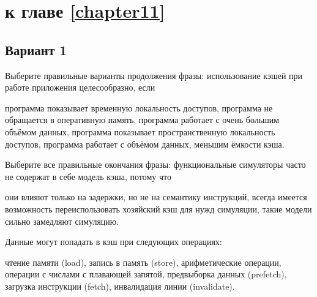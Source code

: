 \section{\Questions к главе \ref{chapter11}} %

\subsection*{Вариант 1}

\begin{questions}
\question[3] Выберите правильные варианты продолжения фразы: использование кэшей при работе приложения целесообразно, если
\begin{choices}
    \correctchoice    программа показывает временную локальность доступов,
    \choice программа не обращается в оперативную память,
    \choice программа работает с очень большим объёмом данных,
    \correctchoice программа показывает пространственную локальность доступов,
    \choice программа работает с объёмом данных, меньшим ёмкости кэша.
\end{choices}

\question[3] Выберите все правильные окончания фразы: функциональные симуляторы часто не содержат в себе модель кэша, потому что
\begin{choices}
	\correctchoice они влияют только на задержки, но не на семантику инструкций,
	\choice всегда имеется возможность переиспользовать хозяйский кэш для нужд симуляции,
	\correctchoice такие модели сильно замедляют симуляцию.
\end{choices}

\question[3] Данные могут попадать в кэш при следующих операциях:
\begin{choices}
	\correctchoice чтение памяти (load),
	\correctchoice запись в память (store),
	\choice арифметические операции,
	\choice операции с числами с плавающей запятой,
	\correctchoice предвыборка данных (prefetch),
	\correctchoice загрузка инструкции (fetch),
	\choice инвалидация линии (invalidate).
\end{choices}

\end{questions}


